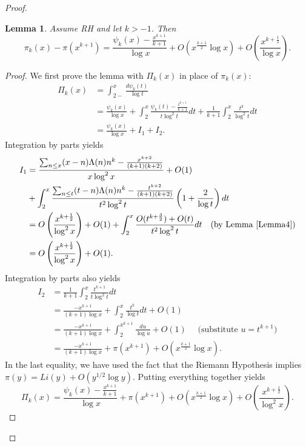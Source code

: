 \documentclass[12pt]{amsart}
\newtheorem{lemma}{Lemma}
\begin{document}
\begin{proof}
\begin{lemma}\label{Lemma5} Assume RH and let $k>-1$. Then 
$$
\pi_k(x)- \pi(x^{k+1}) = \frac{\psi_k(x)-\frac{x^{k+1}}{k+1}}{\log x}  + O(x^{\frac{k+1}2} \log x) + O\left(\frac{x^{k+\frac12}}{\log x}\right).
$$
\end{lemma}

\begin{proof}
We first prove the lemma with $\Pi_{k}(x)$ in place of $\pi_k(x)$:
\begin{align*}
\Pi_k(x) &= \int_{2-}^x\frac {d\psi_k(t)}{\log t} \\
&= \frac{\psi_k(x)}{\log x} + \int_2^x \frac{\psi_k(t)-\frac{t^{k+1}}{k+1}}{t\log^2t} dt + \frac{1}{k+1}\int_2^x \frac{t^k}{\log^2 t} dt\\
&= \frac{\psi_k(x)}{\log x} + I_1 + I_2.
\end{align*}
Integration by parts yields
\begin{align*}
I_1 &= \frac{\sum_{n\le x}  (x-n)\Lambda(n) n^k - \frac{x^{k+2}}{(k+1)(k+2)}}{x \log^2 x} + O(1)\\
& + \int_2^x \frac{\sum_{n\le t} (t-n) \Lambda(n) n^k - \frac{t^{k+2}}{(k+1)(k+2)}}{t^2\log^2 t} \left(1+\frac{2}{\log t}\right) dt\\
&= O\left(\frac{x^{k+\frac12}}{\log^2 x} \right) + O(1)+ \int_2^x \frac{O(t^{k+\frac32})+O(t)}{t^2 \log^2 t} dt \quad (\text{by Lemma \ref{Lemma4}})\\
&= O\left(\frac{x^{k+\frac12}}{\log^2 x}\right)+ O(1).
\end{align*}
Integration by parts also yields
\begin{align*}
I_2 &= \frac{1}{k+1} \int_2^x \frac{t^{k+1}}{t \log^2 t} dt \\
&= \frac{-x^{k+1}}{(k+1)\log x} + \int_2^x \frac{t^k}{\log t} dt + O(1)\\
&= \frac{-x^{k+1}}{(k+1)\log x} + \int_2^ {x^{k+1}} \frac{du}{\log u} + O(1) \quad \text{ (substitute $u=t^{k+1}$)}\\
&= \frac{-x^{k+1}}{(k+1) \log x} + \pi(x^{k+1}) + O\left(x^{\frac{k+1}{2}}\log x\right). 
\end{align*}
In the last equality, we have used the fact \cite[Theorem 13.1]{MV} that the Riemann Hypothesis implies $\pi(y)= Li(y)+ O(y^{1/2}\log y)$. Putting everything together yields 
\begin{equation}\label{PiandPsi}
\Pi_k(x) =  \frac{\psi_k(x)-\frac{x^{k+1}}{k+1}}{\log x} + \pi(x^{k+1}) + O(x^{\frac{k+1}2} \log x)+ O\left(\frac{x^{k+\frac12}}{\log^2 x}\right).
\end{equation}


\end{proof}
\end{proof}
\end{document}
